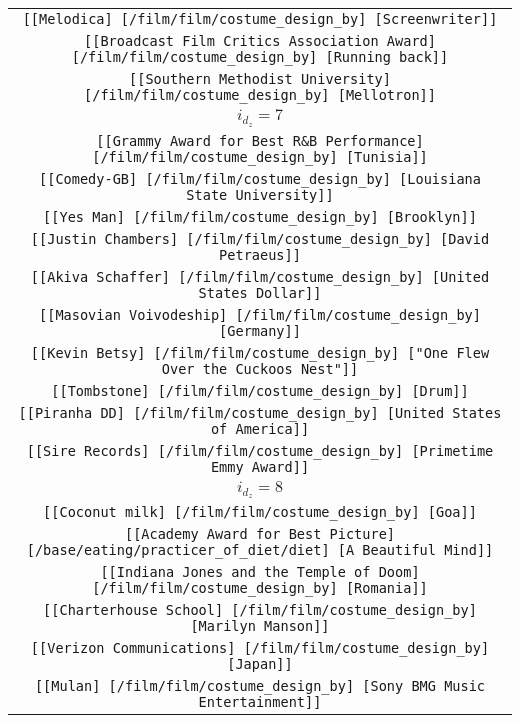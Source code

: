 \begin{longtable}{|c|}
    \texttt{[[Melodica] [/film/film/costume\_design\_by] [Screenwriter]]}\\
    \texttt{[[Broadcast Film Critics Association Award] [/film/film/costume\_design\_by] [Running back]]}\\
    \texttt{[[Southern Methodist University] [/film/film/costume\_design\_by] [Mellotron]]}\\ \hline
    \rowcolor[HTML]{EFEFEF} 
    \textsc{$i_{d_z}=7$}\\ \hline
    \texttt{[[Grammy Award for Best R\&B Performance] [/film/film/costume\_design\_by] [Tunisia]]}\\
    \texttt{[[Comedy-GB] [/film/film/costume\_design\_by] [Louisiana State University]]}\\
    \texttt{[[Yes Man] [/film/film/costume\_design\_by] [Brooklyn]]}\\
    \texttt{[[Justin Chambers] [/film/film/costume\_design\_by] [David Petraeus]]}\\
    \texttt{[[Akiva Schaffer] [/film/film/costume\_design\_by] [United States Dollar]]}\\
    \texttt{[[Masovian Voivodeship] [/film/film/costume\_design\_by] [Germany]]}\\
    \texttt{[[Kevin Betsy] [/film/film/costume\_design\_by] ["One Flew Over the Cuckoos Nest"]]}\\
    \texttt{[[Tombstone] [/film/film/costume\_design\_by] [Drum]]}\\
    \texttt{[[Piranha DD] [/film/film/costume\_design\_by] [United States of America]]}\\
    \texttt{[[Sire Records] [/film/film/costume\_design\_by] [Primetime Emmy Award]]}\\ \hline
    \textsc{$i_{d_z}=8$}\\ \hline
    \texttt{[[Coconut milk] [/film/film/costume\_design\_by] [Goa]]}\\
    \texttt{[[Academy Award for Best Picture] [/base/eating/practicer\_of\_diet/diet] [A Beautiful Mind]]}\\
    \texttt{[[Indiana Jones and the Temple of Doom] [/film/film/costume\_design\_by] [Romania]]}\\
    \texttt{[[Charterhouse School] [/film/film/costume\_design\_by] [Marilyn Manson]]}\\
    \texttt{[[Verizon Communications] [/film/film/costume\_design\_by] [Japan]]}\\
    \texttt{[[Mulan] [/film/film/costume\_design\_by] [Sony BMG Music Entertainment]]}\\

\end{longtable}
